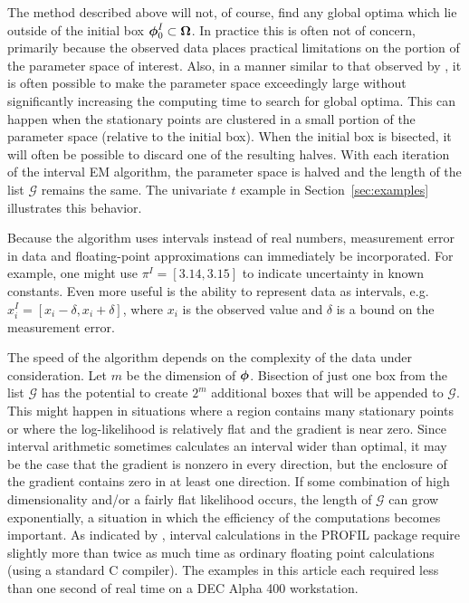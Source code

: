 \documentclass[10pt,twoside]{article}
\begin{document}
The method described above will not, of course, find any global optima which
lie outside of the initial box $\mbox{\boldmath $\phi$}_0^I \subset \mbox{\boldmath $\Omega$}$.  
In practice this is often not of
concern, primarily because the observed data places practical limitations on
the portion of the parameter space of interest.
Also, in a manner similar to that observed by \cite{HansenBook}, 
it is often possible to make the parameter space exceedingly large without
significantly increasing the computing time to search for global optima.
This
can happen when the stationary points are clustered in a small portion of
the
parameter space (relative to the initial box).  When the initial box is
bisected, it will often be possible to discard one of the resulting halves.
With each iteration of the interval EM algorithm, the parameter space is
halved
and the length of the list $\mathcal{G}$ remains the same.  The univariate
$t$
example in Section~\ref{sec:examples} illustrates this behavior.

Because the algorithm uses intervals instead of real numbers, measurement
error in data and floating-point approximations can immediately be
incorporated.  For example, one might use $\pi^I=[3.14,3.15]$ to indicate
uncertainty in known constants.  Even more useful is the ability to
represent
data as intervals, e.g. $x^I_i = [x_i - \delta, x_i + \delta]$, where
$x_i$ is the observed value and $\delta$ is a bound on the measurement
error.


The speed of the algorithm depends on the complexity of
the data under consideration.  Let $m$ be the dimension of $\mbox{\boldmath $\phi$}$.
Bisection of just one box from the list $\mathcal{G}$ has the
potential to create $2^m$ additional boxes that will be appended to
$\mathcal{G}$.  This might happen in situations where a region
contains many stationary points or where the log-likelihood is
relatively flat and the gradient is near zero.  Since interval
arithmetic sometimes calculates an interval wider than optimal, it
may be the case that the gradient is nonzero in every direction, but
the enclosure of the gradient contains zero in at least one
direction.  If some combination of high dimensionality and/or a fairly
flat likelihood occurs, the length of $\mathcal{G}$ can grow
exponentially, a situation in which the efficiency of the computations
becomes important.  As indicated by \cite{Knu94}, interval calculations in
the
PROFIL package require slightly more than twice as much time as ordinary
floating point calculations (using a standard C compiler).  The examples in
this article each required less than one second of real time on a DEC Alpha
400
workstation. 
\end{document}
